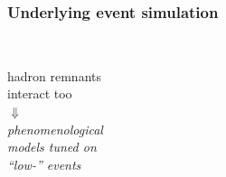 \begin{frame}\frametitle{Underlying event simulation}
\centering


\begin{minipage}{.65\textwidth}\centering
$\quad$
\end{minipage}\begin{minipage}{.35\textwidth}\centering\footnotesize
hadron remnants\\ interact too\\
{\LARGE $\Downarrow$}\\
{\it phenomenological\\ models tuned on\\
``low-\pt'' events}
\end{minipage}

\vspace{.5\paperheight}


\end{frame}


